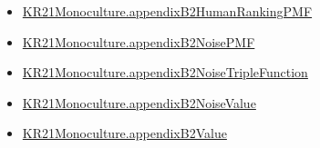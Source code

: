 \documentclass[10pt]{article}
\begin{document}
\begin{itemize}
\item \hyperlink{governing-declaration-ca16c412ff86e21d}{KR21\allowbreak{}Monoculture.\allowbreak{}appendix\allowbreak{}B2\allowbreak{}Human\allowbreak{}Ranking\allowbreak{}PMF}
\item \hyperlink{governing-declaration-8e6ec30fddce1699}{KR21\allowbreak{}Monoculture.\allowbreak{}appendix\allowbreak{}B2\allowbreak{}Noise\allowbreak{}PMF}
\item \hyperlink{governing-declaration-60847befce1f016f}{KR21\allowbreak{}Monoculture.\allowbreak{}appendix\allowbreak{}B2\allowbreak{}Noise\allowbreak{}Triple\allowbreak{}Function}
\item \hyperlink{governing-declaration-c2e627e448258a0b}{KR21\allowbreak{}Monoculture.\allowbreak{}appendix\allowbreak{}B2\allowbreak{}Noise\allowbreak{}Value}
\item \hyperlink{governing-declaration-302704452f418635}{KR21\allowbreak{}Monoculture.\allowbreak{}appendix\allowbreak{}B2\allowbreak{}Value}
\end{itemize}
\end{document}
